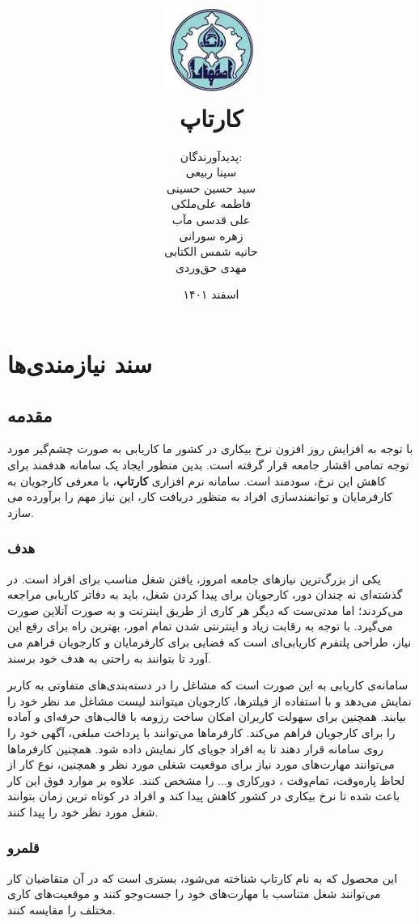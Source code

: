 \documentclass[12pt]{book}
\title{
	\includegraphics[width=3cm, height=3cm]{logo.jpeg} \\ \vspace{2cm}
	{\Huge کارتاپ}
}
\author{
	پدید‌آورندگان: \\
	سینا ربیعی \\
	سید حسین حسینی \\
	فاطمه علی‌ملکی \\
	علی قدسی مآب \\
	زهره سورانی \\
	حانیه شمس الکتابی \\
	مهدی حق‌وردی
}
\date{اسفند ۱۴۰۱}
\begin{document}
	\renewcommand{\bibname}{مراجع}
	\maketitle
	\tableofcontents
	
	\chapter{سند نیازمندی‌ها}
	\section{مقدمه} 
	با توجه به افزایش روز افزون نرخ بیکاری در کشور ما کاریابی به صورت چشم‌گیر مورد توجه تمامی اقشار جامعه قرار گرفته است. بدین منظور ایجاد یک سامانه هدفمند برای کاهش این نرخ، سودمند است. سامانه نرم افزاری \textbf{کارتاپ}، با معرفی کارجویان به کارفرمایان و توانمندسازی افراد به منظور دریافت کار، این نیاز مهم را برآورده می سازد.
	\subsection{هدف}
	یکی از بزرگ‌ترین نیازهای جامعه امروز، یافتن شغل مناسب برای افراد است. در گذشته‌ای نه چندان دور، کارجویان برای پیدا کردن شغل، باید به دفاتر کاریابی مراجعه می‌کردند؛ اما مدتی‌ست که دیگر هر کاری از طریق اینترنت و به صورت آنلاین صورت می‌گیرد. با توجه به رقابت زیاد و اینترنتی شدن تمام امور، بهترین راه برای رفع این نیاز، طراحی پلتفرم کاریابی‌‌ای است که فضایی برای کارفرمایان و کارجویان فراهم می آورد تا بتوانند به راحتی به هدف خود برسند.
	
	سامانه‌ی کاریابی به این صورت است که مشاغل را در دسته‌بندی‌های متفاوتی به کاربر نمایش می‌دهد و با استفاده از فیلترها، کارجویان میتوانند لیست مشاغل مد نظر خود را بیابند. همچنین برای سهولت کاربران امکان ساخت رزومه با قالب‌های حرفه‌ای و آماده را برای کارجویان فراهم می‌کند. کارفرما‌ها می‌توانند با پرداخت مبلغی، آگهی خود را روی سامانه قرار دهند تا به افراد جویای کار نمایش داده شود. همچنین کارفرماها می‌توانند مهارت‌های مورد نیاز برای موقعیت شغلی مورد نظر و همچنین، نوع کار از لحاظ پاره‌وقت، تمام‌وقت ، دورکاری و... را مشخص کنند.
	علاوه بر موارد فوق این کار باعث شده تا نرخ بیکاری در کشور کاهش پیدا کند و افراد در کوتاه ترین زمان بتوانند شغل مورد نظر خود را پیدا کنند.
	
	\subsection{قلمرو} 
	این محصول که به نام کارتاپ شناخته می‌شود، بستری است که در آن متقاضیان کار می‌توانند شغل متناسب با مهارت‌های خود را جست‌وجو کنند و موقعیت‌های کاری مختلف را مقایسه کنند.
	
\end{document}
